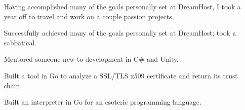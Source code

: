 \item Having accomplished many of the goals personally set at DreamHost, I took a year off to travel and work on a couple passion projects.

\item Successfully achieved many of the goals personally set at DreamHost; took a sabbatical.
\item Mentored someone new to development in C\# and Unity.
\item Built a tool in Go to analyze a SSL/TLS x509 certificate and return its trust chain.
\item Built an interpreter in Go for an esoteric programming language. %
